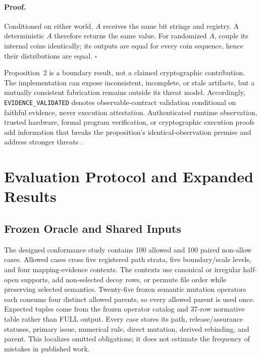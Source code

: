 \documentclass[letterpaper]{article} %
\begin{document}
\paragraph{Proof.}
Conditioned on either world, $A$ receives the same bit strings and registry.
A deterministic $A$ therefore returns the same value.  For randomized $A$,
couple its internal coins identically; its outputs are equal for every coin
sequence, hence their distributions are equal. \hfill$\square$

Proposition~2 is a boundary result, not a claimed cryptographic contribution.
The implementation can expose inconsistent, incomplete, or stale artifacts,
but a mutually consistent fabrication remains outside its threat model.
Accordingly, \texttt{EVIDENCE\_VALIDATED} denotes observable-contract
validation conditional on faithful evidence, never execution attestation.
Authenticated runtime observation, trusted hardware, formal program
verification, or cryptographic execution proofs add information that breaks
the proposition's identical-observation premise and address stronger threats
\citep{zhang2017lightdp,wang2019shadowdp,wang2020checkdp,shamsabadi2024confidential}.

\section{Evaluation Protocol and Expanded Results}
\label{sec:supp-evaluation}

\subsection{Frozen Oracle and Shared Inputs}

The designed conformance study contains 100 allowed and 100 paired non-allow
cases.  Allowed cases cross five registered path strata, five boundary/scale
levels, and four mapping-evidence contexts.  The contexts use canonical or
irregular half-open supports, add non-selected decoy rows, or permute file
order while preserving selected semantics.  Twenty-five frozen semantic
mutation operators each consume four distinct allowed parents, so every
allowed parent is used once.  Expected tuples come from the frozen operator
catalog and 37-row normative table rather than FULL output.  Every case stores
its path, release/assurance statuses, primary issue, numerical rule, direct
mutation, derived rebinding, and parent.  This localizes omitted obligations;
it does not estimate the frequency of mistakes in published work.
\end{document}
